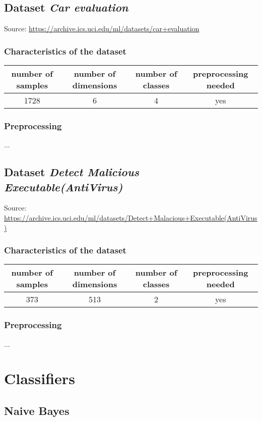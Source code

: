\documentclass[11pt,a4paper,titlepage]{article}
\begin{document}
\subsection{Dataset \textit{Car evaluation}}
Source: \url{https://archive.ics.uci.edu/ml/datasets/car+evaluation}
\subsubsection{Characteristics of the dataset}
\begin{center}
  \begin{tabular}{| c | c | c | c |}
    \hline
    number of samples & number of dimensions & number of classes & preprocessing needed \\ \hline
    1728 & 6 & 4 & yes \\
    \hline
  \end{tabular}
\end{center}
\subsubsection{Preprocessing}
...

\subsection{Dataset \textit{Detect Malicious Executable(AntiVirus)}}
Source: \url{https://archive.ics.uci.edu/ml/datasets/Detect+Malacious+Executable(AntiVirus)}
\subsubsection{Characteristics of the dataset}
\begin{center}
  \begin{tabular}{| c | c | c | c |}
    \hline
    number of samples & number of dimensions & number of classes & preprocessing needed \\ \hline
    373 & 513 & 2 & yes \\
    \hline
  \end{tabular}
\end{center}
\subsubsection{Preprocessing}
...


\section{Classifiers}
\subsection{Naive Bayes}
\end{document}
